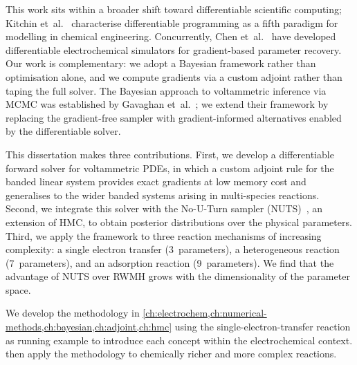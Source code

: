 This work sits within a broader shift toward differentiable scientific
computing; Kitchin et~al.\ \cite{kitchin2025beyond} characterise
differentiable programming as a fifth paradigm for modelling in chemical
engineering. Concurrently, Chen et~al.\ \cite{chen2026differentiable}
have developed differentiable electrochemical simulators for
gradient-based parameter recovery. Our work is complementary: we
adopt a Bayesian framework rather than optimisation alone, and we
compute gradients via a custom adjoint rather than taping the full
solver. The Bayesian approach to voltammetric inference via MCMC was
established by Gavaghan et~al.\ \cite{gavaghan2018bayesian}; we
extend their framework by replacing the gradient-free sampler with
gradient-informed alternatives enabled by the differentiable solver.

This dissertation makes three contributions. First, we develop a
differentiable forward solver for voltammetric PDEs, in which a custom
adjoint rule for the banded linear system provides exact gradients at low
memory cost and generalises to the wider banded systems arising in
multi-species reactions. Second, we integrate this solver with the
No-U-Turn sampler (NUTS)~\cite{hoffman2014no}, an
extension of HMC, to obtain posterior distributions over the physical
parameters. Third, we apply the framework to three reaction
mechanisms of increasing complexity:  a single electron transfer
(3~parameters), a heterogeneous reaction (7~parameters), and an
adsorption reaction (9~parameters). We find that the advantage of
NUTS over RWMH grows with the dimensionality of the parameter space.

We develop the methodology in
\cref{ch:electrochem,ch:numerical-methods,ch:bayesian,ch:adjoint,ch:hmc}
using the single-electron-transfer reaction as running example to
introduce each concept within the electrochemical context.
 then apply the methodology to
chemically richer and more complex reactions.
